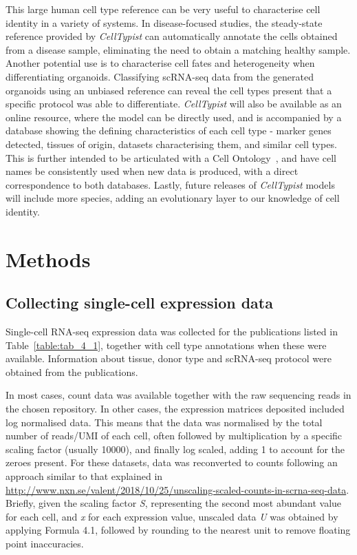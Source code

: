 This large human cell type reference can be very useful to characterise cell identity in a variety of systems. In disease-focused studies, the steady-state reference provided by \textit{CellTypist} can automatically annotate the cells obtained from a disease sample, eliminating the need to obtain a matching healthy sample. Another potential use is to characterise cell fates and heterogeneity when differentiating organoids. Classifying scRNA-seq data from the generated organoids using an unbiased reference can reveal the cell types present that a specific protocol was able to differentiate. \textit{CellTypist} will also be available as an online resource, where the model can be directly used, and is accompanied by a database showing the defining characteristics of each cell type - marker genes detected, tissues of origin, datasets characterising them, and similar cell types. This is further intended to be articulated with a Cell Ontology~\citep{bard_ontology_2005}, and have cell names be consistently used when new data is produced, with a direct correspondence to both databases. Lastly, future releases of \textit{CellTypist} models will include more species, adding an evolutionary layer to our knowledge of cell identity.


\section{Methods}
\label{section4.4}
\subsection{Collecting single-cell expression data}
\label{section4.4_datacol}
Single-cell RNA-seq expression data was collected for the publications listed in Table~\ref{table:tab_4_1}, together with cell type annotations when these were available. Information about tissue, donor type and scRNA-seq protocol were obtained from the publications.

In most cases, count data was available together with the raw sequencing reads in the chosen repository. In other cases, the expression matrices deposited included log normalised data. This means that the data was normalised by the total number of reads/UMI of each cell, often followed by multiplication by a specific scaling factor (usually 10000), and finally log scaled, adding 1 to account for the zeroes present. For these datasets, data was reconverted to counts following an approach similar to that explained in \url{http://www.nxn.se/valent/2018/10/25/unscaling-scaled-counts-in-scrna-seq-data}. Briefly, given the scaling factor \textit{S}, representing the second most abundant value for each cell, and \textit{x} for each expression value, unscaled data \textit{U} was obtained by applying Formula 4.1, followed by rounding to the nearest unit to remove floating point inaccuracies.

